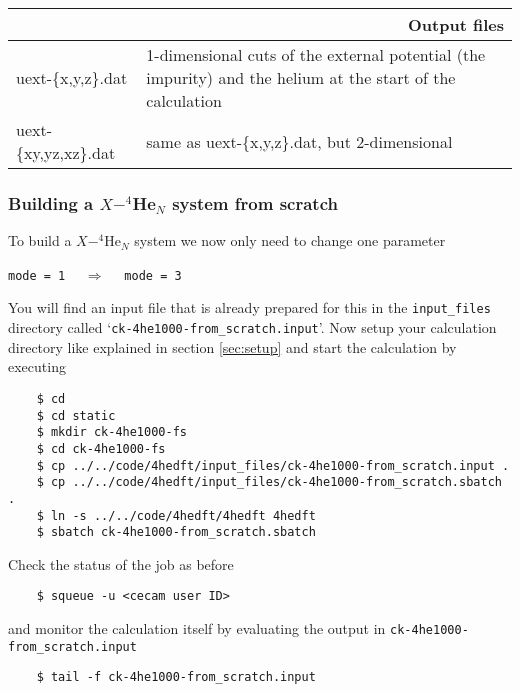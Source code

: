 \documentclass[10pt,a4paper]{article}
\begin{document}
		\begin{center}
		\begin{tabular}{l|p{7.5cm}}
			\multicolumn{2}{r}{\textbf{Output files}} \\
			\hline\hline
			uext-\{x,y,z\}.dat			& 1-dimensional cuts of the external potential (the impurity) and the helium at the start of the calculation \\
			\hline
			uext-\{xy,yz,xz\}.dat				& same as uext-\{x,y,z\}.dat, but 2-dimensional  \\
		\end{tabular}
	\end{center}

	\subsubsection{Building a $X-^4$He$_{N}$ system from scratch}\label{sec:ck-fs}
	To build a $X-^4$He$_N$ system we now only need to change one parameter
	\begin{center}
	\verb|mode = 1|	$\quad\Longrightarrow\quad$	\verb|mode = 3|
	\end{center}
	You will find an input file that is already prepared for this in the \verb|input_files| directory called `\verb|ck-4he1000-from_scratch.input|'. Now setup your calculation directory like explained in section \ref{sec:setup} and start the calculation by executing
	\begin{verbatim}
	$ cd 
	$ cd static
	$ mkdir ck-4he1000-fs
	$ cd ck-4he1000-fs
	$ cp ../../code/4hedft/input_files/ck-4he1000-from_scratch.input .
	$ cp ../../code/4hedft/input_files/ck-4he1000-from_scratch.sbatch .
	$ ln -s ../../code/4hedft/4hedft 4hedft
	$ sbatch ck-4he1000-from_scratch.sbatch
	\end{verbatim}
	Check the status of the job as before
	\begin{verbatim}
	$ squeue -u <cecam user ID>
	\end{verbatim}
	and monitor the calculation itself by evaluating the output in \verb|ck-4he1000-from_scratch.input|
	\begin{verbatim}
	$ tail -f ck-4he1000-from_scratch.input
	\end{verbatim}
	
\end{document}
